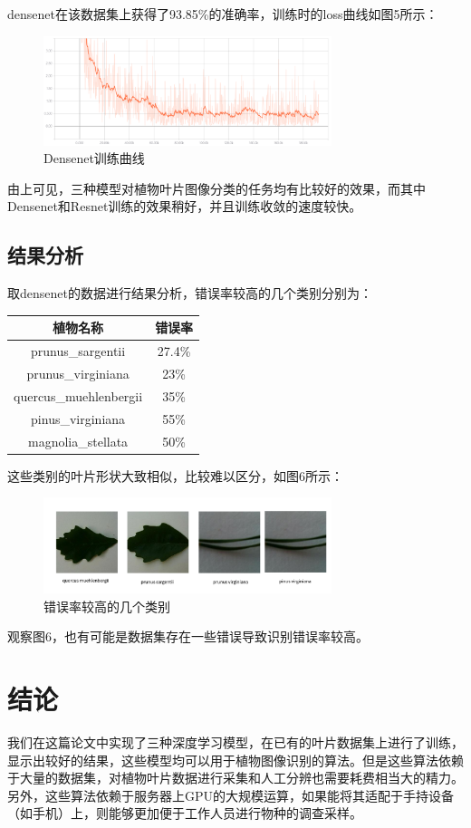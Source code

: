 \documentclass[a4paper]{ctexart} %
\begin{document}
densenet在该数据集上获得了93.85\%的准确率，训练时的loss曲线如图5所示：

\begin{figure}[htbp]
	\centering
	\includegraphics[width=0.75\textwidth]{densenet.png}
	\caption{Densenet训练曲线}
	\label{figure}
\end{figure}
由上可见，三种模型对植物叶片图像分类的任务均有比较好的效果，而其中Densenet和Resnet训练的效果稍好，并且训练收敛的速度较快。

\subsection*{结果分析}

取densenet的数据进行结果分析，错误率较高的几个类别分别为：
\begin{center}
	\begin{tabular}{|c|c|}
		\hline 植物名称&错误率\\
		\hline prunus\_sargentii&27.4\%\\
		\hline prunus\_virginiana&23\%\\
		\hline quercus\_muehlenbergii&35\%\\
		\hline pinus\_virginiana&55\%\\
		\hline magnolia\_stellata&50\%\\
		\hline
	\end{tabular}
\end{center}
这些类别的叶片形状大致相似，比较难以区分，如图6所示：
	\begin{figure}[htbp]
		\centering
		\includegraphics[width=0.75\textwidth]{img3.png}
		\caption{错误率较高的几个类别}
		\label{figure}
	\end{figure}

观察图6，也有可能是数据集存在一些错误导致识别错误率较高。


\section*{结论}
我们在这篇论文中实现了三种深度学习模型，在已有的叶片数据集上进行了训练，显示出较好的结果，这些模型均可以用于植物图像识别的算法。但是这些算法依赖于大量的数据集，对植物叶片数据进行采集和人工分辨也需要耗费相当大的精力。另外，这些算法依赖于服务器上GPU的大规模运算，如果能将其适配于手持设备（如手机）上，则能够更加便于工作人员进行物种的调查采样。



\printbibliography[heading=none]
\end{document}
